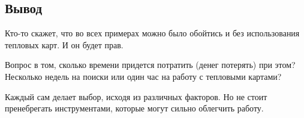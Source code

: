 \documentclass{article}
\begin{document}
\subsection{Вывод}

Кто-то скажет, что во всех примерах можно было обойтись и без использования тепловых карт. И он будет прав.

Вопрос в том, сколько времени придется потратить (денег потерять) при этом? Несколько недель на поиски или один час на работу с тепловыми картами?

Каждый сам делает выбор, исходя из различных факторов. Но не стоит пренебрегать инструментами, которые могут сильно облегчить работу.
\end{document}
